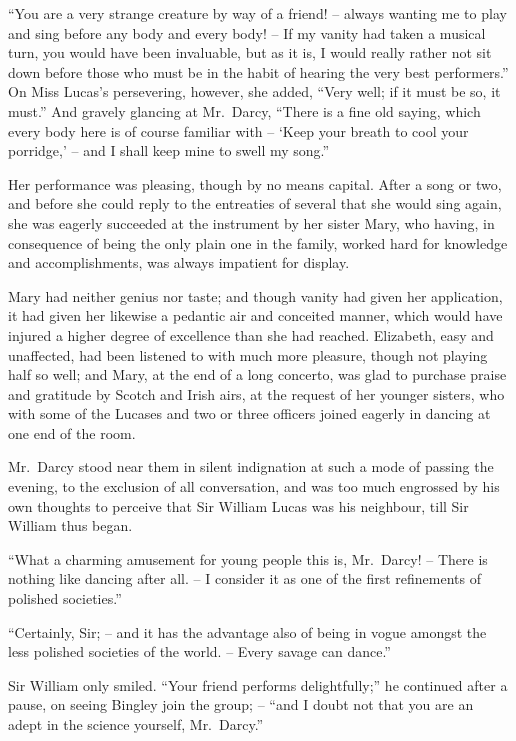 “You are a very strange creature by way of a friend! -- always
wanting me to play and sing before any body and
every body! -- If my vanity had taken a musical turn,
you would have been invaluable, but as it is, I would
really rather not sit down before those who must be in
the habit of hearing the very best performers.” On Miss
Lucas’s persevering, however, she added, “Very well;
if it must be so, it must.” And gravely glancing at
Mr.\ Darcy, “There is a fine old saying, which every body
here is of course familiar with -- ‘Keep your breath to cool
your porridge,’ -- and I shall keep mine to swell my
song.”

Her performance was pleasing, though by no means
capital. After a song or two, and before she could reply
to the entreaties of several that she would sing again, she
was eagerly succeeded at the instrument by her sister
Mary, who having, in consequence of being the only plain
one in the family, worked hard for knowledge and accomplishments,
was always impatient for display.

Mary had neither genius nor taste; and though vanity
had given her application, it had given her likewise a
pedantic air and conceited manner, which would have
injured a higher degree of excellence than she had reached.
Elizabeth, easy and unaffected, had been listened to with
much more pleasure, though not playing half so well;
and Mary, at the end of a long concerto, was glad to purchase
praise and gratitude by Scotch and Irish airs, at
the request of her younger sisters, who with some of the
Lucases and two or three officers joined eagerly in dancing
at one end of the room.

Mr.\ Darcy stood near them in silent indignation at such
a mode of passing the evening, to the exclusion of all
conversation, and was too much engrossed by his own thoughts
to perceive that Sir William Lucas was his neighbour, till
Sir William thus began.

“What a charming amusement for young people this
is, Mr.\ Darcy! -- There is nothing like dancing after all. --
I consider it as one of the first refinements of polished
societies.”

“Certainly, Sir; -- and it has the advantage also of
being in vogue amongst the less polished societies of the
world. -- Every savage can dance.”

Sir William only smiled. “Your friend performs
delightfully;” he continued after a pause, on seeing
Bingley join the group; -- “and I doubt not that you are
an adept in the science yourself, Mr.\ Darcy.”

